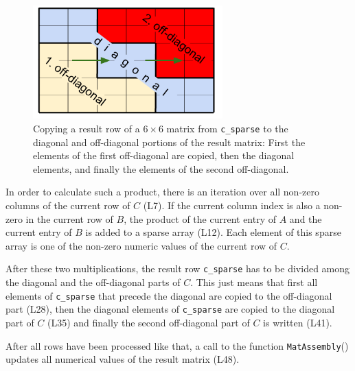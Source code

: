\begin{figure}[tb]
\centering
\includegraphics[width=0.65\textwidth]{mm_diag_offdiag}
\caption{Copying a result row of a $6\times 6$ matrix from \texttt{c\_sparse} to the diagonal and off-diagonal portions of the result matrix: First the elements of the first off-diagonal are copied, then the diagonal elements, and finally the elements of the second off-diagonal.}
\label{fig:diag_row}
\end{figure}

In order to calculate such a product, there is an iteration over all non-zero columns of the current row of $C$ (L7). If the current column index is also a non-zero in the current row of $B$, the product of the current entry of $A$ and the current entry of $B$ is added to a sparse array (L12). Each element of this sparse array is one of the non-zero numeric values of the current row of $C$. 

After these two multiplications, the result row \texttt{c\_sparse} has to be divided among the diagonal and the off-diagonal parts of $C$. This just means that first all elements of \texttt{c\_sparse} that precede the diagonal are copied to the off-diagonal part (L28), then the diagonal elements of \texttt{c\_sparse} are copied to the diagonal part of $C$ (L35) and finally the second off-diagonal part of $C$ is written (L41). 

After all rows have been processed like that, a call to the function \texttt{MatAssembly}() updates all numerical values of the result matrix (L48).



\belowcaptionskip=-10pt

